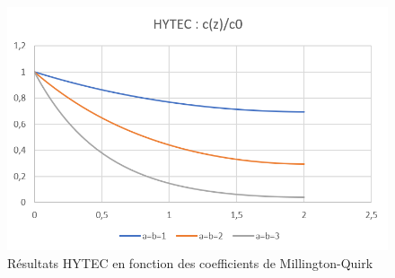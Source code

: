 \documentclass{article}
\begin{document}
\begin{figure}[H]
    \centering
    \includegraphics[height = 0.4 \textheight]{III_C_10.png}
    \caption{Résultats HYTEC en fonction des coefficients de Millington-Quirk}
    \label{fig:sens_hytec_mq}
\end{figure}


\end{document}
